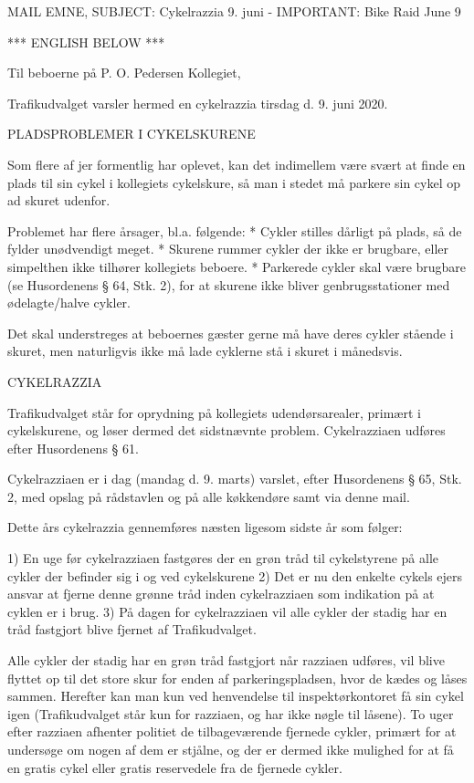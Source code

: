 MAIL EMNE, SUBJECT: Cykelrazzia 9. juni - IMPORTANT: Bike Raid June 9

*** ENGLISH BELOW ***

Til beboerne på P. O. Pedersen Kollegiet,

Trafikudvalget varsler hermed en cykelrazzia tirsdag d. 9. juni 2020.


PLADSPROBLEMER I CYKELSKURENE

Som flere af jer formentlig har oplevet, kan det indimellem være svært at finde en plads til sin cykel i kollegiets cykelskure, så man i stedet må parkere sin cykel op ad skuret udenfor.

Problemet har flere årsager, bl.a. følgende:
* Cykler stilles dårligt på plads, så de fylder unødvendigt meget.
* Skurene rummer cykler der ikke er brugbare, eller simpelthen ikke tilhører kollegiets beboere.
* Parkerede cykler skal være brugbare (se Husordenens § 64, Stk. 2), for at skurene ikke bliver genbrugsstationer med ødelagte/halve cykler.

Det skal understreges at beboernes gæster gerne må have deres cykler stående i skuret, men naturligvis ikke må lade cyklerne stå i skuret i månedsvis.


CYKELRAZZIA

Trafikudvalget står for oprydning på kollegiets udendørsarealer, primært i cykelskurene, og løser dermed det sidstnævnte problem. Cykelrazziaen udføres efter Husordenens § 61.

Cykelrazziaen er i dag (mandag d. 9. marts) varslet, efter Husordenens § 65, Stk. 2, med opslag på rådstavlen og på alle køkkendøre samt via denne mail.

Dette års cykelrazzia gennemføres næsten ligesom sidste år som følger:

1) En uge før cykelrazziaen fastgøres der en grøn tråd til cykelstyrene på alle cykler der befinder sig i og ved cykelskurene
2) Det er nu den enkelte cykels ejers ansvar at fjerne denne grønne tråd inden cykelrazziaen som indikation på at cyklen er i brug.
3) På dagen for cykelrazziaen vil alle cykler der stadig har en tråd fastgjort blive fjernet af Trafikudvalget.

Alle cykler der stadig har en grøn tråd fastgjort når razziaen udføres, vil blive flyttet op til det store skur for enden af parkeringspladsen, hvor de kædes og låses sammen. Herefter kan man kun ved henvendelse til inspektørkontoret få sin cykel igen (Trafikudvalget står kun for razziaen, og har ikke nøgle til låsene). To uger efter razziaen afhenter politiet de tilbageværende fjernede cykler, primært for at undersøge om nogen af dem er stjålne, og der er dermed ikke mulighed for at få en gratis cykel eller gratis reservedele fra de fjernede cykler.



